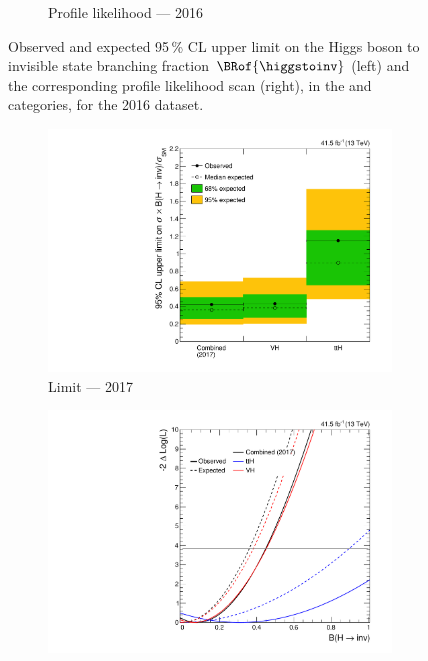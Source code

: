 \begin{figure}[htbp]
\begin{subfigure}[t]{0.45\textwidth}
        \caption{Profile likelihood --- 2016}
    \end{subfigure}
    \caption[Observed and expected 95\,\% CL upper limit on the Higgs boson to invisible state branching fraction $\BRof{\higgstoinv}$ and the corresponding profile likelihood scan, in the \ttH and \VH categories, for the 2016 dataset]{Observed and expected 95\,\% CL upper limit on the Higgs boson to invisible state branching fraction $\BRof{\higgstoinv}$ (left) and the corresponding profile likelihood scan (right), in the \ttH and \VH categories, for the 2016 dataset.}
    \label{fig:htoinv_limit_likelihood_2016}
\end{figure}

\begin{figure}[htbp]
    \centering
    \begin{subfigure}[t]{0.45\textwidth}
        \includegraphics[width=\textwidth]{chapters/higgstoinv/figures/limits/per_year/limit_2017_comb.pdf}
        \caption{Limit --- 2017}
    \end{subfigure}
    \hspace{0.05\textwidth}
    \begin{subfigure}[t]{0.45\textwidth}
        \includegraphics[width=\textwidth]{chapters/higgstoinv/figures/likelihood_scan/profile_likelihood_scan_2017.pdf}

\end{subfigure}
\end{figure}
